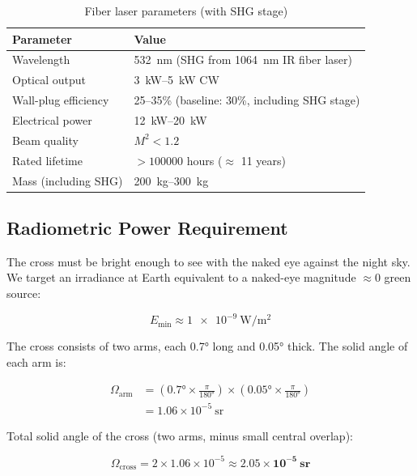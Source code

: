 \documentclass[10pt,letterpaper]{article}
\begin{document}
\begin{table}[!ht]
\centering\small
\caption{Fiber laser parameters (with SHG stage)}
\label{tab:laser-params}
\begin{tabularx}{\linewidth}{lX}
\toprule
\textbf{Parameter} & \textbf{Value} \\
\midrule
Wavelength & \SI{532}{\nano\meter} (SHG from \SI{1064}{\nano\meter} IR fiber laser) \\
Optical output & \SI{3}{\kilo\watt}--\SI{5}{\kilo\watt} CW \\
Wall-plug efficiency & 25--35\% (baseline: 30\%, including SHG stage) \\
Electrical power & \SI{12}{\kilo\watt}--\SI{20}{\kilo\watt} \\
Beam quality & $M^2 < 1.2$ \\
Rated lifetime & $> \num{100000}$ hours ($\approx$ 11 years) \\
Mass (including SHG) & \SI{200}{\kilo\gram}--\SI{300}{\kilo\gram} \\
\bottomrule
\end{tabularx}
\end{table}

\subsection{Radiometric Power Requirement}

The cross must be bright enough to see with the naked eye against the night sky.
We target an irradiance at Earth equivalent to a naked-eye magnitude $\approx 0$
green source:

\[
  E_{\min} \approx \SI{1e-9}{\watt\per\meter\squared}
\]

The cross consists of two arms, each \ang{0.7} long and \ang{0.05} thick. The
solid angle of each arm is:

\begin{align*}
  \Omega_{\text{arm}} &= \left(\ang{0.7} \times \frac{\pi}{\ang{180}}\right)
                       \times \left(\ang{0.05} \times \frac{\pi}{\ang{180}}\right) \\
                      &= 1.06 \times 10^{-5}\ \si{\steradian}
\end{align*}

Total solid angle of the cross (two arms, minus small central overlap):

\[
  \Omega_{\text{cross}} = 2 \times 1.06 \times 10^{-5}
                        \approx \mathbf{2.05 \times 10^{-5}\ \si{\steradian}}
\]
\end{document}
